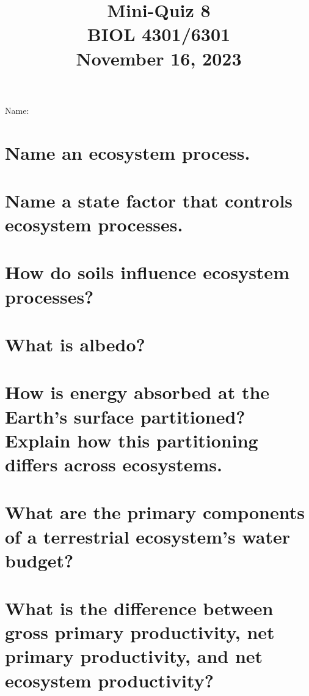 \documentclass[12pt, notitlepage]{article}   	%
\title{
	\textbf{
		Mini-Quiz 8
	} \\
	\large BIOL 4301/6301 \\
	\large November 16, 2023 \\
}
\date{\vspace{-5ex}}
\def\wl{\par \vspace{\baselineskip}}
\begin{document}
{\selectfont %

\large{Name:}

{\let\newpage\relax\maketitle}

\section{\small{Name an ecosystem process.}}

\wl
\wl
\wl
\wl

\section{\small{Name a state factor that controls ecosystem processes.}}

\wl
\wl
\wl
\wl

\section{\small{How do soils influence ecosystem processes?}}

\newpage

\section{\small{What is albedo?}}

\wl
\wl
\wl
\wl

\section{\small{How is energy absorbed at the Earth's surface partitioned?
Explain how this partitioning differs across ecosystems.}}

\wl
\wl
\wl
\wl
\wl
\wl
\wl
\wl
\wl
\wl
\wl
\wl

\section{\small{What are the primary components of a terrestrial ecosystem's water budget?}}

\newpage

\section{\small{What is the difference between gross primary productivity, net primary productivity,
and net ecosystem productivity?}}

}
\end{document}
